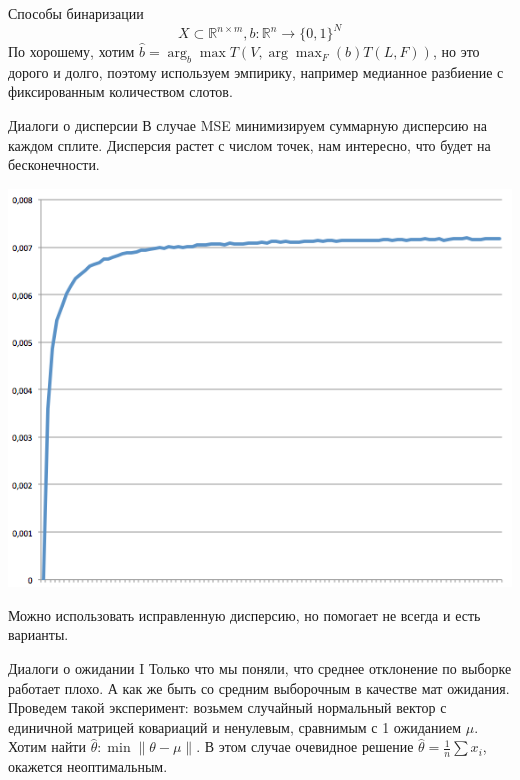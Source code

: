 \documentclass[14pt, fleqn, xcolor={dvipsnames, table}]{beamer}
\begin{document}
\begin{frame}{Способы бинаризации}
\small
$$
X \subset \mathbb{R}^{n\times m}, b: \mathbb{R}^n \to \{0,1\}^N
$$
По хорошему, хотим $\hat{b} = \arg_b \max T\left(V,\arg \max_F(b) T(L,F)\right)$, но это дорого и долго, поэтому используем эмпирику, например медианное разбиение с фиксированным количеством слотов.
\end{frame}

\begin{frame}{Диалоги о дисперсии}
\small
В случае MSE минимизируем суммарную дисперсию на каждом сплите. Дисперсия растет с числом точек, нам интересно, что будет на бесконечности.
\begin{center}
\includegraphics[height=0.5\textheight]{D.png} 
\end{center}
Можно использовать исправленную дисперсию, но помогает не всегда и есть варианты.
\end{frame}

\begin{frame}{Диалоги о ожидании I} %
Только что мы поняли, что среднее отклонение по выборке работает плохо. А как же быть со средним выборочным в качестве мат ожидания. \\
Проведем такой эксперимент: возьмем случайный нормальный вектор с единичной матрицей ковариаций и ненулевым, сравнимым с 1 ожиданием $\mu$. Хотим найти $\hat{\theta}: \min \|\theta - \mu\|$. В этом случае очевидное решение $\hat{\theta} = \frac{1}{n}\sum x_i$, окажется неоптимальным. %
\end{frame}
\end{document}
